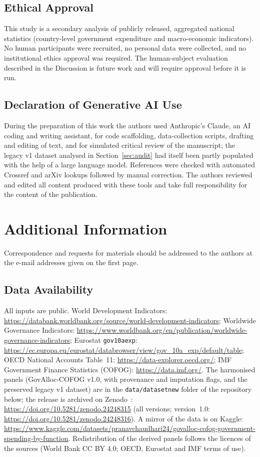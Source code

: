 \documentclass[11pt,a4paper]{article}
\DeclareRobustCommand*{\_}{\textunderscore\hskip0pt\relax}
\begin{document}
\subsection*{Ethical Approval}
This study is a secondary analysis of publicly released, aggregated national statistics (country-level government expenditure and macro-economic indicators). No human participants were recruited, no personal data were collected, and no institutional ethics approval was required. The human-subject evaluation described in the Discussion is future work and will require approval before it is run.

\subsection*{Declaration of Generative AI Use}
During the preparation of this work the authors used Anthropic's Claude, an AI coding and writing assistant, for code scaffolding, data-collection scripts, drafting and editing of text, and for simulated critical review of the manuscript; the legacy v1 dataset analysed in Section~\ref{sec:audit} had itself been partly populated with the help of a large language model. References were checked with automated Crossref and arXiv lookups followed by manual correction. The authors reviewed and edited all content produced with these tools and take full responsibility for the content of the publication.

\section*{Additional Information}
Correspondence and requests for materials should be addressed to the authors at the e-mail addresses given on the first page.

\subsection*{Data Availability}
All inputs are public. World Development Indicators: \url{https://databank.worldbank.org/source/world-development-indicators}; Worldwide Governance Indicators: \url{https://www.worldbank.org/en/publication/worldwide-governance-indicators}; Eurostat \texttt{gov\_10a\_exp}: \url{https://ec.europa.eu/eurostat/databrowser/view/gov_10a_exp/default/table}; OECD National Accounts Table~11: \url{https://data-explorer.oecd.org/}; IMF Government Finance Statistics (COFOG): \url{https://data.imf.org/}. The harmonised panels (GovAlloc-COFOG v1.0, with provenance and imputation flags, and the preserved legacy v1 dataset) are in the \texttt{data/dataset\_new} folder of the repository below; the release is archived on Zenodo~\cite{chaudhari2026dataset}: \url{https://doi.org/10.5281/zenodo.24248315} (all versions; version~1.0: \url{https://doi.org/10.5281/zenodo.24248316}). A mirror of the data is on Kaggle: \url{https://www.kaggle.com/datasets/pranavchaudhari24/govalloc-cofog-government-spending-by-function}. Redistribution of the derived panels follows the licences of the sources (World Bank CC BY 4.0; OECD, Eurostat and IMF terms of use).
\end{document}
